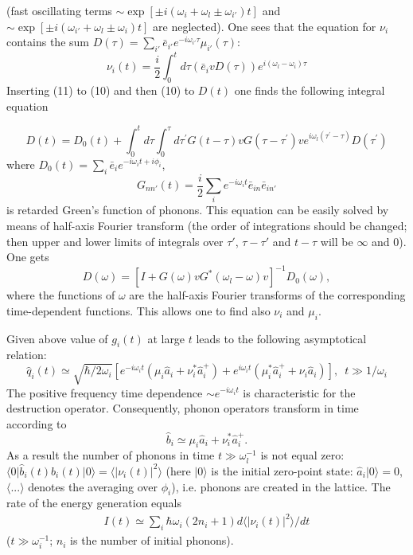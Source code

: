 (fast oscillating terms 
$\sim \exp{[\pm i(\omega_i + \omega_l \pm \omega_{i'})t]}$ and
$\sim \exp{[\pm i(\omega_{i'} + \omega_l \pm \omega_{i})t]}$ are neglected).
One sees that the equation for $\nu_i$ contains the sum $D(\tau) 
= \sum_{i'}\bar{e}_{i'} e^{-i\omega_{i'}\tau}\mu_{i'}(\tau)$:
\begin{equation}
\nu_i(t)=\frac{i}{2} \int_0^t d\tau (\bar{e}_i v D(\tau))
e^{i(\omega_l - \omega_i)\tau}
\end{equation}
Inserting (11) to (10) and then (10) to $D(t)$ one finds the following 
integral equation 

\begin{equation}
D(t)= D_0(t)+ \int_0^t d\tau \int_0^{\tau} d\tau^{'} G(t-\tau)vG(\tau-\tau^{'})
v e^{i\omega_l(\tau^{'}-\tau)} D(\tau^{'})
\end{equation}
where $D_0(t)=\sum_i \bar{e}_ie^{-i\omega_i t +i\phi_i}$,
$$
G_{nn'}(t) = \frac{i}{2}\sum_i e^{-i\omega_i t} \bar{e}_{in} \bar{e}_{in'}
$$
is retarded Green's function of phonons.
This equation can be easily solved by means of half-axis Fourier transform
(the order of integrations should be changed; then upper and lower limits of 
integrals over $\tau'$, $\tau-\tau'$ and $t-\tau$ will be $\infty$ and $0$).
One gets \cite{hizhrev}
\begin{equation}
D(\omega) = [I + G(\omega)vG^*(\omega_l-\omega)v]^{-1} D_0(\omega),
\end{equation}
where the functions of $\omega$ are the half-axis Fourier transforms of the
corresponding time-dependent functions.
This allows one to find also $\nu_i$ and $\mu_i$.

Given above value  of $g_i(t)$ at large $t$
leads to the following asymptotical relation:
$$
\hat{q}_{i}(t) \simeq \sqrt{\hbar/2\omega_{i}}
[e^{-i\omega_it}(\mu_i \hat{a}_{i} + \nu_i^*\hat{a}_{i}^{+})
+ e^{i\omega_it}(\mu_i^* \hat{a}_i^+ + \nu_i\hat{a}_i)],\,\,\,t\gg 1/\omega_i
$$
The positive frequency time dependence $\sim e^{-i\omega_i t}$ is 
characteristic for the destruction operator. Consequently,
phonon operators transform in time according to
$$
\hat{b}_i \simeq \mu_i\hat{a}_i + \nu_i^* \hat{a}_i^+.
$$
As a result the number of phonons in time $t \gg \omega_l^{-1}$ is not equal 
zero:
$\langle 0\vert\hat{b}_i(t)b_i(t)\vert 0\rangle=
\langle \vert\nu_i(t)\vert ^2 \rangle$ 
(here $\vert 0\rangle$ is the initial zero-point state: 
$\hat{a}_i\vert 0\rangle=0$, $\langle...\rangle$ denotes the averaging over 
$\phi_i$), i.e. phonons are created in the lattice. The rate of the energy 
generation equals
\begin{eqnarray}
I(t) \simeq \sum_i 
\hbar\omega_i (2n_i +1) d\langle \vert\nu_i(t)\vert ^2 \rangle/dt 
\end{eqnarray}
($t\gg\omega_i^{-1}$; $n_i$ is the number of initial phonons). 
